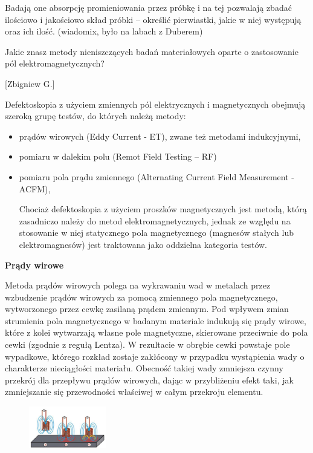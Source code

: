 \documentclass{article}
\begin{document}
\begin{enumerate}
Badają one absorpcję promieniowania przez próbkę i na tej pozwalają zbadać ilościowo i jakościowo skład próbki – określić pierwiastki, jakie w niej występują oraz ich ilość. (wiadomix, było na labach z Duberem)



{\Large \bf  \item Jakie znasz metody nieniszczących badań materiałowych oparte o zastosowanie
pól elektromagnetycznych?} [Zbigniew G.]

Defektoskopia z użyciem zmiennych pól elektrycznych i magnetycznych obejmują szeroką grupę testów, do których należą metody:
\begin{itemize}
\item prądów wirowych (Eddy Current - ET), zwane też metodami indukcyjnymi,
\item pomiaru w dalekim polu (Remot Field Testing – RF)
\item pomiaru pola prądu zmiennego (Alternating Current Field Measurement - ACFM),

 Chociaż defektoskopia z użyciem proszków magnetycznych jest metodą, którą zasadniczo należy do metod elektromagnetycznych, jednak ze względu na stosowanie w niej statycznego pola magnetycznego (magnesów stałych lub elektromagnesów) jest traktowana jako oddzielna kategoria testów.
  
\end{itemize}

 
 {\bf Prądy wirowe}
 
Metoda prądów wirowych polega na wykrawaniu wad w metalach przez wzbudzenie prądów wirowych za pomocą zmiennego pola magnetycznego, wytworzonego przez cewkę zasilaną prądem zmiennym. Pod wpływem zmian strumienia pola magnetycznego w badanym materiale indukują się prądy wirowe, które z kolei wytwarzają własne pole magnetyczne, skierowane przeciwnie do pola cewki (zgodnie z regułą Lentza). W rezultacie w obrębie cewki powstaje pole wypadkowe, którego rozkład zostaje zakłócony w przypadku wystąpienia wady o charakterze nieciągłości materiału. Obecność takiej wady zmniejsza czynny przekrój dla przepływu prądów wirowych, dając w przybliżeniu efekt taki, jak zmniejszanie się przewodności właściwej w całym przekroju elementu.
 
 
\begin{figure}[h!]
\centering
\includegraphics[width=0.3\textwidth]{wir}
\end{figure}
 

\end{enumerate}
\end{document}
